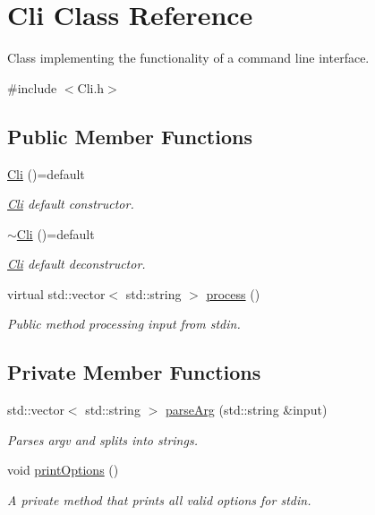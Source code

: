 \hypertarget{classCli}{}\section{Cli Class Reference}
\label{classCli}


Class implementing the functionality of a command line interface.  




{\ttfamily \#include $<$Cli.\+h$>$}

\subsection*{Public Member Functions}
\begin{DoxyCompactItemize}
\item 
\hyperlink{classCli_a8f7e5909bf64db25f1f264d206d61140}{Cli} ()=default
\begin{DoxyCompactList}\small\item\em \hyperlink{classCli}{Cli} default constructor. \end{DoxyCompactList}\item 
\hyperlink{classCli_a516ed9664c99d6275d7675194f5564bf}{$\sim$\+Cli} ()=default
\begin{DoxyCompactList}\small\item\em \hyperlink{classCli}{Cli} default deconstructor. \end{DoxyCompactList}\item 
virtual std\+::vector$<$ std\+::string $>$ \hyperlink{classCli_a9788fa4a19943c09af95b4653822d690}{process} ()
\begin{DoxyCompactList}\small\item\em Public method processing input from stdin. \end{DoxyCompactList}\end{DoxyCompactItemize}
\subsection*{Private Member Functions}
\begin{DoxyCompactItemize}
\item 
std\+::vector$<$ std\+::string $>$ \hyperlink{classCli_a8c364ee0c6abe9589a4e0c8758d17f88}{parse\+Arg} (std\+::string \&input)
\begin{DoxyCompactList}\small\item\em Parses argv and splits into strings. \end{DoxyCompactList}\item 
void \hyperlink{classCli_a8251d6c89698aaf128318fc3ad4b2906}{print\+Options} ()
\begin{DoxyCompactList}\small\item\em A private method that prints all valid options for stdin. \end{DoxyCompactList}\end{DoxyCompactItemize}


